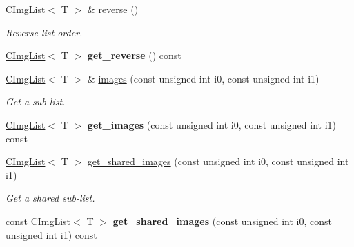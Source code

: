\begin{DoxyCompactItemize}
\item 
\hypertarget{structcimg__library_1_1CImgList_a4bddad7bd0b0831f2394d563c65448e5}{
\hyperlink{structcimg__library_1_1CImgList}{CImgList}$<$ T $>$ \& \hyperlink{structcimg__library_1_1CImgList_a4bddad7bd0b0831f2394d563c65448e5}{reverse} ()}
\label{structcimg__library_1_1CImgList_a4bddad7bd0b0831f2394d563c65448e5}

\begin{DoxyCompactList}\small\item\em Reverse list order. \item\end{DoxyCompactList}\item 
\hypertarget{structcimg__library_1_1CImgList_a08e5fffa109ffcbc5c5501caaac31419}{
\hyperlink{structcimg__library_1_1CImgList}{CImgList}$<$ T $>$ {\bfseries get\_\-reverse} () const }
\label{structcimg__library_1_1CImgList_a08e5fffa109ffcbc5c5501caaac31419}

\item 
\hypertarget{structcimg__library_1_1CImgList_a00f2db037b12bb52c151afd2b5b14b7f}{
\hyperlink{structcimg__library_1_1CImgList}{CImgList}$<$ T $>$ \& \hyperlink{structcimg__library_1_1CImgList_a00f2db037b12bb52c151afd2b5b14b7f}{images} (const unsigned int i0, const unsigned int i1)}
\label{structcimg__library_1_1CImgList_a00f2db037b12bb52c151afd2b5b14b7f}

\begin{DoxyCompactList}\small\item\em Get a sub-\/list. \item\end{DoxyCompactList}\item 
\hypertarget{structcimg__library_1_1CImgList_abe3f4aad864f0508b33d8511263b519c}{
\hyperlink{structcimg__library_1_1CImgList}{CImgList}$<$ T $>$ {\bfseries get\_\-images} (const unsigned int i0, const unsigned int i1) const }
\label{structcimg__library_1_1CImgList_abe3f4aad864f0508b33d8511263b519c}

\item 
\hypertarget{structcimg__library_1_1CImgList_a7b8806bd21527aa64aa3bd0e7506c9d8}{
\hyperlink{structcimg__library_1_1CImgList}{CImgList}$<$ T $>$ \hyperlink{structcimg__library_1_1CImgList_a7b8806bd21527aa64aa3bd0e7506c9d8}{get\_\-shared\_\-images} (const unsigned int i0, const unsigned int i1)}
\label{structcimg__library_1_1CImgList_a7b8806bd21527aa64aa3bd0e7506c9d8}

\begin{DoxyCompactList}\small\item\em Get a shared sub-\/list. \item\end{DoxyCompactList}\item 
\hypertarget{structcimg__library_1_1CImgList_a9b596dd0de2b20e50321d8c89952c401}{
const \hyperlink{structcimg__library_1_1CImgList}{CImgList}$<$ T $>$ {\bfseries get\_\-shared\_\-images} (const unsigned int i0, const unsigned int i1) const }
\label{structcimg__library_1_1CImgList_a9b596dd0de2b20e50321d8c89952c401}


\end{DoxyCompactItemize}
